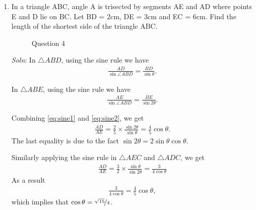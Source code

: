 \documentclass{article}
\begin{document}
\begin{enumerate}
\item  In a triangle ABC, angle A is trisected by segments AE and AD where points E and D lie on BC. Let BD = $2$cm, DE = $3$cm and EC = $6$cm. Find the length of the shortest side of the triangle ABC.
    \begin{figure}[ht]
    \centering
    \caption{Question 4}
  \end{figure}

  \emph{Soln}: In $\triangle ABD$, using the sine rule we have
  \begin{align}
    \frac{AD}{\sin\angle ABD} = \frac{BD}{\sin\theta}.
    \label{eq:sine1}
  \end{align}

  In $\triangle ABE$, using the sine rule we have
  \begin{align}
    \frac{AE}{\sin\angle ABD} = \frac{BE}{\sin 2\theta}.
    \label{eq:sine2}
  \end{align}

  Combining \eqref{eq:sine1} and \eqref{eq:sine2}, we get
  \begin{align}
   \frac{AD}{AE} = \frac{2}{5}\times \frac{\sin 2\theta}{\sin \theta} = \frac{4}{5}\cos\theta.
    \label{eq:ratio1}
  \end{align}
  The last equality is due to the fact $\sin 2\theta = 2\sin \theta\cos\theta$.

  Similarly applying the sine rule in $\triangle AEC$ and $\triangle ADC$, we get
  \begin{align}
   \frac{AD}{AE} = \frac{3}{2}\times \frac{\sin \theta}{\sin 2\theta} = \frac{3}{4\cos\theta}
    \label{eq:ratio2}
  \end{align}
  As a result
  \begin{align*}
    \frac{3}{4\cos\theta} = \frac{4}{5}\cos\theta,
  \end{align*}
  which implies that $\cos\theta = \nicefrac{\sqrt{15}}{4}$.


\end{enumerate}
\end{document}
